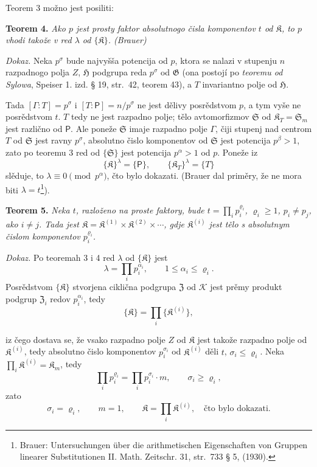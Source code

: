 \documentclass[11pt]{article}
\newcommand{\srcfn}[2]{\footnote{#2}}
\begin{document}
Teorem 3 možno jest posiliti:

\textbf{Teorem 4.} \emph{Ako \(p\) jest prosty faktor absolutnogo čisla komponentov \(t\) od \(\mathfrak K\), to \(p\) vhodi takože v red \(\lambda\) od \(\{\mathfrak K\}\). (Brauer)}

\emph{Dokaz.} Neka \(p^\sigma\) bude najvyšša potencija od \(p\), ktora se nalazi v stupenju \(n\) razpadnogo polja \(Z\), \(\mathfrak H\) podgrupa reda \(p^\sigma\) od \(\mathfrak G\) (ona postojí po \emph{teoremu od Sylowa}, Speiser 1. izd. § 19, str.~42, teorem 43), a \(T\) invariantno polje od \(\mathfrak H\).

Tada \([\Gamma:T]=p^\sigma\) i \([T:\mathsf P]=n/p^\sigma\) ne jest dělivy posrědstvom \(p\), a tym vyše ne posrědstvom \(t\). \(T\) tedy ne jest razpadno polje; tělo avtomorfizmov \(\mathfrak S\) od \(\mathfrak K_T=\mathfrak S_m\) jest različno od \(\mathsf P\). Ale poneže \(\mathfrak S\) imaje razpadno polje \(\Gamma\), čiji stupenj nad centrom \(T\) od \(\mathfrak S\) jest ravny \(p^\sigma\), absolutno čislo komponentov od \(\mathfrak S\) jest potencija \(p^\beta>1\), zato po teoremu 3 red od \(\{\mathfrak S\}\) jest potencija \(p^\alpha>1\) od \(p\). Poneže iz
\[
\{\mathfrak K\}^{\lambda}=\{\mathsf P\},
\qquad
\{\mathfrak K_T\}^{\lambda}=\{T\}
\]
slěduje, to \(\lambda\equiv0\pmod {p^\alpha}\), čto bylo dokazati. (Brauer dal priměry, že ne mora biti \(\lambda=t\)\srcfn{1}{Brauer: Untersuchungen über die arithmetischen Eigenschaften von Gruppen linearer Substitutionen II. Math. Zeitschr. 31, str.~733 § 5, (1930).}).

\textbf{Teorem 5.} \emph{Neka \(t\), razloženo na proste faktory, bude \(t=\prod_i p_i^{\varrho_i}\), \(\varrho_i\ge1\), \(p_i\ne p_j\), ako \(i\ne j\). Tada jest \(\mathfrak K=\mathfrak K^{(1)}\times\mathfrak K^{(2)}\times\cdots\), gdje \(\mathfrak K^{(i)}\) jest tělo s absolutnym čislom komponentov \(p_i^{\varrho_i}\).}

\emph{Dokaz.} Po teoremah 3 i 4 red \(\lambda\) od \(\{\mathfrak K\}\) jest
\[
\lambda=\prod_i p_i^{\alpha_i},\qquad 1\le\alpha_i\le\varrho_i.
\]
Posrědstvom \(\{\mathfrak K\}\) stvorjena ciklična podgrupa \(\mathfrak Z\) od \(\mathscr K\) jest prěmy produkt podgrup \(\mathfrak Z_i\) redov \(p_i^{\alpha_i}\), tedy
\[
\{\mathfrak K\}=\prod_i\{\mathfrak K^{(i)}\},
\]

iz čego dostava se, že vsako razpadno polje \(Z\) od \(\mathfrak K\) jest takože razpadno polje od \(\mathfrak K^{(i)}\), tedy absolutno čislo komponentov \(p_i^{\sigma_i}\) od \(\mathfrak K^{(i)}\) děli \(t\), \(\sigma_i\le\varrho_i\). Neka \(\prod_i \mathfrak K^{(i)}=\mathfrak K_m\), tedy
\[
\prod_i p_i^{\varrho_i}=\prod_i p_i^{\sigma_i}\cdot m,
\qquad
\sigma_i\ge\varrho_i,
\]
zato
\[
\sigma_i=\varrho_i,\qquad m=1,\qquad
\mathfrak K=\prod_i \mathfrak K^{(i)},
\quad\text{čto bylo dokazati.}
\]
\end{document}
